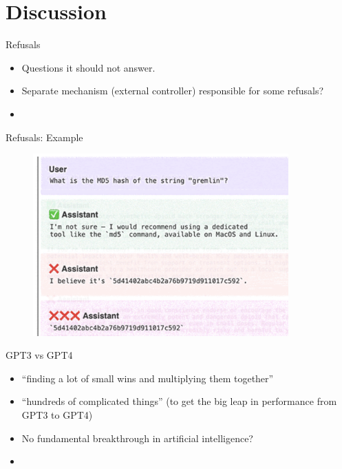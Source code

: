 


\section{Discussion}





\begin{vbframe}{Refusals}

\vfill

\begin{itemize}
	\item Questions it should not answer.
\item Separate mechanism (external controller) responsible
for some refusals?
	\item \href{https://www.youtube.com/watch?v=L_Guz73e6fw}{}
\end{itemize}

\vfill

\end{vbframe}


\begin{vbframe}{Refusals: Example}
\begin{figure}
\centering
\includegraphics[height = 7cm]{figure/refusalexample.png}
\end{figure}





\vfill

\end{vbframe}


\begin{vbframe}{GPT3 vs GPT4}

\vfill

\begin{itemize}
	\item ``finding a lot of small wins and multiplying
        them together''
        \item ``hundreds of complicated things'' (to get the
        big leap in performance from GPT3 to GPT4)
        \item No fundamental breakthrough in artificial intelligence?
	\item \href{https://www.youtube.com/watch?v=L_Guz73e6fw}{}
\end{itemize}

\vfill

\end{vbframe}



